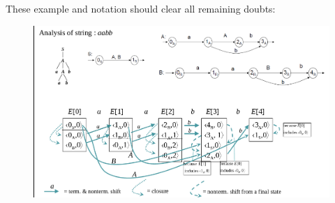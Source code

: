 			These example and notation should clear all remaining doubts:
			\begin{figure}[H]
				\centering
				\includegraphics[width = \textwidth]{./images/exEarley.png}
			\end{figure}